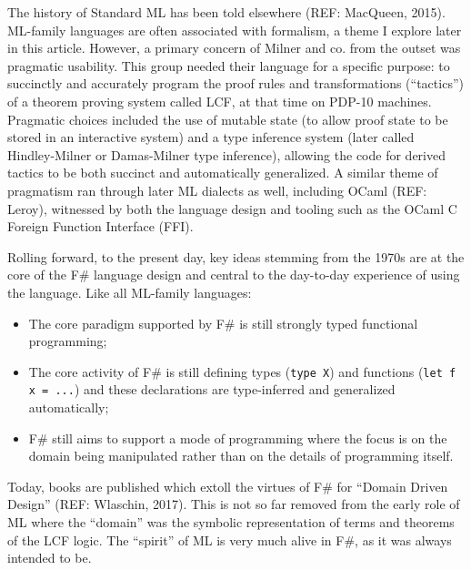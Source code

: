 \documentclass[acmsmall]{acmart}\settopmatter{}
\begin{document}
The history of Standard ML has been told elsewhere (REF: MacQueen, 2015). ML-family languages are often associated with
formalism, a theme I explore later in this article. However, a primary concern of Milner and co. from the outset was pragmatic
usability. This group needed their language for a specific purpose: to succinctly and accurately program the proof rules and
transformations (“tactics”) of a theorem proving system called LCF, at that time on PDP-10 machines. Pragmatic choices
included the use of mutable state (to allow proof state to be stored in an interactive system) and a type inference
system (later called Hindley-Milner or Damas-Milner type inference), allowing the code for derived tactics to be both
succinct and automatically generalized.  A similar theme of pragmatism ran through later ML dialects as well, including
OCaml (REF: Leroy), witnessed by both the language design and tooling such as the OCaml C Foreign Function Interface (FFI).

Rolling forward, to the present day, key ideas stemming from the 1970s are at the core of the F\# language design
and central to the day-to-day experience of using the language.  Like all ML-family languages:
\begin{itemize}
\item The core paradigm supported by F\# is still strongly typed functional programming;
\item The core activity of F\# is still defining types (\texttt{type X}) and functions (\texttt{let f x = ...}) and these
declarations are type-inferred and generalized automatically;
\item F\# still aims to support a mode of programming where the focus is on the domain being manipulated rather than on the details of programming itself.
\end{itemize}

Today, books are published which extoll the virtues of F\# for “Domain Driven Design” (REF: Wlaschin, 2017).  This is not so
far removed from the early role of ML where the “domain” was the symbolic representation of terms and theorems of the
LCF logic. The “spirit” of ML is very much alive in F\#, as it was always intended to be. 
\end{document}
